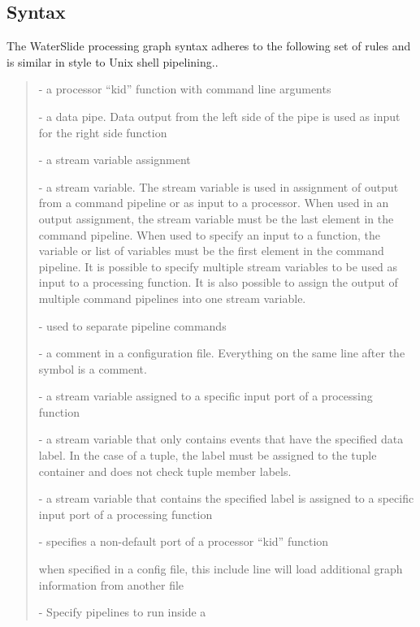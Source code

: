 \documentclass[11pt]{article}
\begin{document}
\subsection{Syntax}
The WaterSlide processing graph syntax adheres to the following set of rules and is similar in style to Unix shell pipelining..
\begin{quote}
\begin{description}\itemsep6pt
\item [processor] - a processor ``kid'' function with command line arguments
\item [\textbar] - a data pipe.  Data output from the left side of the pipe is used as input for the right
side function
\item [-\textgreater] - a stream variable assignment
\item [\$foo] - a stream variable. The stream variable is used in assignment of output from a
command pipeline or as input to a processor.  When used in an output
assignment, the stream variable must be the last element in the command pipeline.  When used to
specify an input to a function, the variable or list of variables must be the first element in the
command pipeline.  It is possible to specify multiple stream variables to be used as input to a
processing function.  It is also possible to assign the output of multiple command pipelines into
one stream variable.
\item [;] - used to separate pipeline commands 
\item [\# and //] - a comment in a configuration file. Everything on the same line after the symbol
is a comment.
\item [\$foo:PORT] - a stream variable assigned to a specific input port of a processing function
\item [\$foo.LABEL] - a stream variable that only contains events that have the specified data label.
In the case of a tuple, the label must be assigned to the tuple container and does not check tuple
member labels.
\item [\$foo.LABEL:PORT] - a stream variable that contains the specified label is assigned to a
specific input port of a processing function
\item [PORT:processor] - specifies a non-default port of a processor ``kid'' function
\item [\#include \emph{filename}] when specified in a config file, this include line will load additional
graph information from another file
\item [\%thread(num) \{ ... \}] - Specify pipelines to run inside a 

\end{description}
\end{quote}
\end{document}
